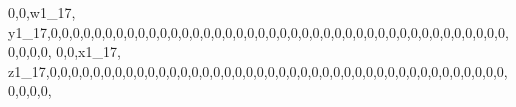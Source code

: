 \documentclass[]{article}
\newenvironment{Shaded}{\begin{snugshade}}{\end{snugshade}}
\newcommand{\DecValTok}[1]{\textcolor[rgb]{0.00,0.00,0.81}{#1}}
\newcommand{\NormalTok}[1]{#1}
\begin{document}
\begin{Shaded}
\begin{Highlighting}[]
\DecValTok{0}\NormalTok{,}\DecValTok{0}\NormalTok{,w1_}\DecValTok{17}\NormalTok{, y1_}\DecValTok{17}\NormalTok{,}\DecValTok{0}\NormalTok{,}\DecValTok{0}\NormalTok{,}\DecValTok{0}\NormalTok{,}\DecValTok{0}\NormalTok{,}\DecValTok{0}\NormalTok{,}\DecValTok{0}\NormalTok{,}\DecValTok{0}\NormalTok{,}\DecValTok{0}\NormalTok{,}\DecValTok{0}\NormalTok{,}\DecValTok{0}\NormalTok{,}\DecValTok{0}\NormalTok{,}\DecValTok{0}\NormalTok{,}\DecValTok{0}\NormalTok{,}\DecValTok{0}\NormalTok{,}\DecValTok{0}\NormalTok{,}\DecValTok{0}\NormalTok{,}\DecValTok{0}\NormalTok{,}\DecValTok{0}\NormalTok{,}\DecValTok{0}\NormalTok{,}\DecValTok{0}\NormalTok{,}\DecValTok{0}\NormalTok{,}\DecValTok{0}\NormalTok{,}\DecValTok{0}\NormalTok{,}\DecValTok{0}\NormalTok{,}\DecValTok{0}\NormalTok{,}\DecValTok{0}\NormalTok{,}\DecValTok{0}\NormalTok{,}\DecValTok{0}\NormalTok{,}\DecValTok{0}\NormalTok{,}\DecValTok{0}\NormalTok{,}\DecValTok{0}\NormalTok{,}\DecValTok{0}\NormalTok{,}\DecValTok{0}\NormalTok{,}\DecValTok{0}\NormalTok{,}\DecValTok{0}\NormalTok{,}\DecValTok{0}\NormalTok{,}\DecValTok{0}\NormalTok{,}\DecValTok{0}\NormalTok{,}\DecValTok{0}\NormalTok{,}\DecValTok{0}\NormalTok{,}\DecValTok{0}\NormalTok{,}\DecValTok{0}\NormalTok{,}\DecValTok{0}\NormalTok{,}\DecValTok{0}\NormalTok{,}\DecValTok{0}\NormalTok{,}\DecValTok{0}\NormalTok{,}
\DecValTok{0}\NormalTok{,}\DecValTok{0}\NormalTok{,x1_}\DecValTok{17}\NormalTok{, z1_}\DecValTok{17}\NormalTok{,}\DecValTok{0}\NormalTok{,}\DecValTok{0}\NormalTok{,}\DecValTok{0}\NormalTok{,}\DecValTok{0}\NormalTok{,}\DecValTok{0}\NormalTok{,}\DecValTok{0}\NormalTok{,}\DecValTok{0}\NormalTok{,}\DecValTok{0}\NormalTok{,}\DecValTok{0}\NormalTok{,}\DecValTok{0}\NormalTok{,}\DecValTok{0}\NormalTok{,}\DecValTok{0}\NormalTok{,}\DecValTok{0}\NormalTok{,}\DecValTok{0}\NormalTok{,}\DecValTok{0}\NormalTok{,}\DecValTok{0}\NormalTok{,}\DecValTok{0}\NormalTok{,}\DecValTok{0}\NormalTok{,}\DecValTok{0}\NormalTok{,}\DecValTok{0}\NormalTok{,}\DecValTok{0}\NormalTok{,}\DecValTok{0}\NormalTok{,}\DecValTok{0}\NormalTok{,}\DecValTok{0}\NormalTok{,}\DecValTok{0}\NormalTok{,}\DecValTok{0}\NormalTok{,}\DecValTok{0}\NormalTok{,}\DecValTok{0}\NormalTok{,}\DecValTok{0}\NormalTok{,}\DecValTok{0}\NormalTok{,}\DecValTok{0}\NormalTok{,}\DecValTok{0}\NormalTok{,}\DecValTok{0}\NormalTok{,}\DecValTok{0}\NormalTok{,}\DecValTok{0}\NormalTok{,}\DecValTok{0}\NormalTok{,}\DecValTok{0}\NormalTok{,}\DecValTok{0}\NormalTok{,}\DecValTok{0}\NormalTok{,}\DecValTok{0}\NormalTok{,}\DecValTok{0}\NormalTok{,}\DecValTok{0}\NormalTok{,}\DecValTok{0}\NormalTok{,}\DecValTok{0}\NormalTok{,}\DecValTok{0}\NormalTok{,}\DecValTok{0}\NormalTok{,}

\end{Highlighting}
\end{Shaded}
\end{document}
